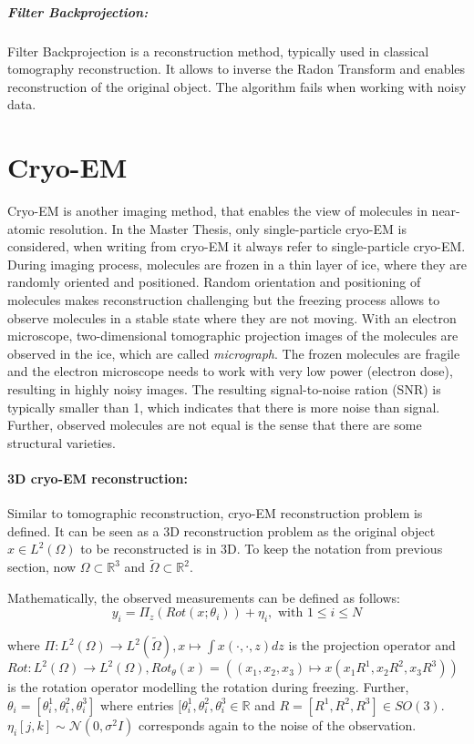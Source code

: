 \subparagraph{Filter Backprojection:}
Filter Backprojection \cite{tomographicReconstruction} is a reconstruction method, typically used in classical tomography reconstruction.
It allows to inverse the Radon Transform and enables reconstruction of the original object. The algorithm fails when working with 
noisy data.

\section{Cryo-EM}
Cryo-EM is another imaging method, that enables the view of molecules in near-atomic resolution.
In the Master Thesis, only single-particle cryo-EM\cite{singleParticleCryoEm} is considered, when writing from cryo-EM it always refer to single-particle cryo-EM.
During imaging process, molecules are frozen in a thin layer of ice, where they are randomly oriented and positioned. 
Random orientation and positioning of molecules makes reconstruction challenging but
the freezing process allows to observe molecules in a stable state where they are not moving.
With an electron microscope, two-dimensional tomographic projection images of the molecules are observed in the ice,
which are called \textit{micrograph}. The frozen molecules are fragile and the electron microscope needs to work with
very low power (electron dose), resulting in highly noisy images. The resulting signal-to-noise ration (SNR)
is typically smaller than 1, which indicates that there is more noise than signal\cite{cryoEmMath2}.
Further, observed molecules are not equal is the sense that there are some structural varieties.


\paragraph{3D cryo-EM reconstruction:}
Similar to tomographic reconstruction, cryo-EM reconstruction problem\cite{cryoEmMath} is defined.
It can be seen as a 3D reconstruction problem as the original object $x \in L^2(\Omega)$ to be reconstructed is in 3D.
To keep the notation from previous section, now $\Omega \subset \mathbb{R}^3 $ and $\tilde{\Omega} \subset \mathbb{R}^2 $.

Mathematically, the observed measurements can be defined as follows:
\begin{equation}
    \label{eg:cryoEmSimple}
    y_i = \Pi_z ( Rot (x; \theta_i)) + \eta_i, \text{ with } 1 \leq i \leq N
\end{equation}

where $\Pi : L^2(\Omega) \to L^2(\tilde{\Omega}), x \mapsto  \int x(\cdot,\cdot,z) dz$ is the projection operator
and $Rot : L^2(\Omega) \to L^2(\Omega), Rot_\theta(x) = \left((x_1,x_2,x_3) \mapsto x( x_1R^1, x_2R^2, x_3R^3)\right)$ is the rotation operator modelling the rotation during freezing.
Further, $\theta_i = [\theta_i^1, \theta_i^2, \theta_i^3 ] $ where entries $ [\theta_i^1, \theta_i^2, \theta_i^3 \in \mathbb{R}$ and 
$R = [R^1, R^2, R^3] \in SO(3)$. $\eta_i[j,k] \sim \mathcal{N}(0,\sigma^2I)$ corresponds again to the noise of the observation.



